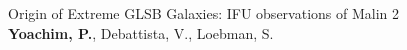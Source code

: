 


{\sc Origin of Extreme GLSB Galaxies:  IFU observations of Malin 2}\\
{\bf Yoachim, P.}, Debattista, V., Loebman, S.


\nocite{*}





